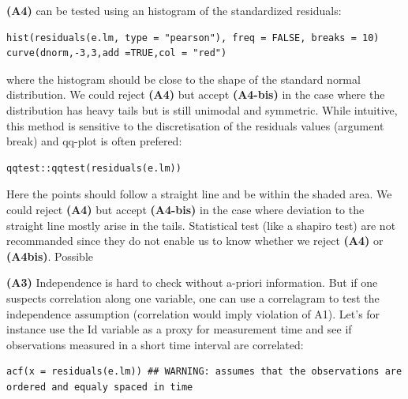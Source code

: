 \documentclass{article}
\begin{document}
\noindent \textbf{(A4)} can be tested using an histogram of the standardized residuals:
\lstset{language=r,label= ,caption= ,captionpos=b,numbers=none}
\begin{lstlisting}
hist(residuals(e.lm, type = "pearson"), freq = FALSE, breaks = 10)
curve(dnorm,-3,3,add =TRUE,col = "red")
\end{lstlisting}
where the histogram should be close to the shape of the standard
normal distribution. We could reject \textbf{(A4)} but accept \textbf{(A4-bis)} in
the case where the distribution has heavy tails but is still unimodal
and symmetric. While intuitive, this method is sensitive to the
discretisation of the residuals values (argument break) and qq-plot is
often prefered:
\lstset{language=r,label= ,caption= ,captionpos=b,numbers=none}
\begin{lstlisting}
qqtest::qqtest(residuals(e.lm))
\end{lstlisting}
Here the points should follow a straight line and be within the shaded
area. We could reject \textbf{(A4)} but accept \textbf{(A4-bis)} in the case where
deviation to the straight line mostly arise in the tails.  Statistical
test (like a shapiro test) are not recommanded since they do not
enable us to know whether we reject \textbf{(A4)} or \textbf{(A4bis)}. Possible



\bigskip

\noindent \textbf{(A3)} Independence is hard to check without a-priori information. But
if one suspects correlation along one variable, one can use a
correlagram to test the independence assumption (correlation would
imply violation of A1). Let's for instance use the Id variable as a
proxy for measurement time and see if observations measured in a short
time interval are correlated:
\lstset{language=r,label= ,caption= ,captionpos=b,numbers=none}
\begin{lstlisting}
acf(x = residuals(e.lm)) ## WARNING: assumes that the observations are ordered and equaly spaced in time
\end{lstlisting}
\end{document}
